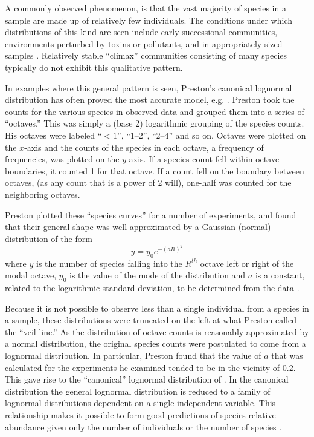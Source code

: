 A commonly observed phenomenon, is that the vast majority of species
in a sample are made up of relatively few individuals. The conditions
under which distributions of this kind are seen include early
successional communities, environments perturbed by toxins or
pollutants, and in appropriately sized samples
\cite{MacArthur60,May86}. Relatively stable ``climax'' communities
consisting of many species typically do not exhibit this qualitative
pattern.

In examples where this general pattern is seen, Preston's canonical
lognormal distribution has often proved the most accurate model,
e.g. \cite{Williams64}. Preston \cite{Preston48} took the counts for
the various species in observed data and grouped them into a series of
``octaves.'' This was simply a (base 2) logarithmic grouping of
the species counts. His octaves were labeled ``$<1$'', ``1--2'',
``2--4'' and so on. Octaves were plotted on the $x$-axis and the
counts of the species in each octave, a frequency of frequencies, was
plotted on the $y$-axis. If a species count fell within octave
boundaries, it counted 1 for that octave. If a count fell on the
boundary between octaves, (as any count that is a power of 2 will),
one-half was counted for the neighboring octaves.

Preston plotted these ``species curves'' for a number of experiments,
and found that their general shape was well approximated by a Gaussian
(normal) distribution of the form
$$ y = y_0 e^{-{(aR)}^2} $$
where $y$ is the number of species falling into the $R^{th}$ octave left
or right of the modal octave, $y_0$ is the value of the mode of the
distribution and $a$ is a constant, related to the logarithmic standard
deviation, to be determined from the data \cite{Preston48}.

Because it is not possible to observe less than a single individual
from a species in a sample, these distributions were truncated on the
left at what Preston called the ``veil line.''  As the distribution of
octave counts is reasonably approximated by a normal
distribution, the original species counts were postulated to come from
a lognormal distribution. In particular, Preston found that the value
of $a$ that was calculated for the experiments he examined tended to
be in the vicinity of $0.2$. This gave rise to the ``canonical''
lognormal distribution of \cite{Preston62a,Preston62b}.  In the
canonical distribution the general lognormal distribution is reduced
to a family of lognormal distributions dependent on a single
independent variable. This relationship makes it possible to form good
predictions of species relative abundance given only the number of
individuals or the number of species \cite{Preston62a,Sugihara80}.

